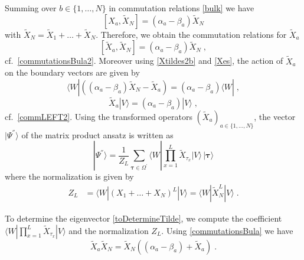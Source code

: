 \documentclass[10pt]{article}
\numberwithin{equation}{section}
\numberwithin{equation}{subsection}
\newcommand{\Xt}{\widetilde{X}}
\newcommand{\co}{\;,}
\newcommand{\dt}{\;.}
\begin{document}
Summing over $b\in \{1,\ldots,N\}$ in commutation relations \eqref{bulk} we have
\begin{equation} 
	\left[X_{a},\Xt_{N}\right]=(\alpha_{a}-\beta_{a})\Xt_{N}%
\end{equation}
with $\widetilde{X}_{N}=\widetilde{X}_{1}+\ldots+\widetilde{X}_{N}$. 
Therefore, we obtain the commutation relations for $\Xt_{a}$ 
\begin{equation}\label{commutationsBula}
	\left[\Xt_{a},\Xt_{N}\right]=(\alpha_{a}-\beta_{a})\Xt_{N}\co %
\end{equation}
cf.~\eqref{commutationsBula2}.
Moreover using \eqref{Xtildes2b} and \eqref{Xes}, the action of $\Xt_{a}$ on the boundary vectors are given by 
\begin{equation}\label{commLEFT}
	\langle W|\left((\alpha_{a}-\beta_{a})\Xt_{N}-\Xt_{a}\right)=(\alpha_{a}-\beta_{a})\langle W|%
	\co
\end{equation}
\begin{equation}\label{commRIGHT}
	\Xt_{a} |V\rangle= (\alpha_{a}-\beta_{a})|V\rangle%
	\co
\end{equation} 
cf.~\eqref{commLEFT2}.
Using the transformed operators $(\widetilde{X}_{a})_{a\in\{1,\ldots,N\}}$, the vector $|\Psi^{''}\rangle$ of the matrix product ansatz is written as
\begin{equation}\label{toDetermineTilde}
	|\Psi^{''}\rangle = \frac{1}{Z_{L}}\sum_{\bm{\tau}\in \Omega^{'}}\langle W|\prod_{x=1}^{L}\widetilde{X}_{\tau_{x}}
	|V \rangle \,|\bm{\tau}\rangle
\end{equation}
where the normalization is given by 
\begin{align}
		Z_{L}&=\langle W|(X_{1}+\ldots+X_{N})^{L}|V\rangle=\langle W|\widetilde{X}_{N}^{L}|V\rangle\dt
\end{align}
\begin{comment}
The basis is 
$$
|\bm{n}\rangle =|n_{1}^{1},\ldots,n_{N}^{1}\rangle \otimes \ldots\otimes |n_{1}^{L},\ldots,n_{N}^{L}\rangle
$$
such that, for each site $x\in \{1,\ldots,L\}$, $|n^{x}\rangle=|n_{1}^{x},\ldots,n_{N}^{x}\rangle\in \Omega_{x}^{'}$. \\
\end{comment}
To determine the eigenvector \eqref{toDetermineTilde}, we compute the coefficient $\langle W|\prod_{x=1}^{L}\widetilde{X}_{\tau_{x}}
|V \rangle$ and the normalization $Z_{L}$. Using \eqref{commutationsBula} we have
\begin{equation}\label{UsefulRelation}
	\widetilde{X}_{a}\widetilde{X}_{N}=\widetilde{X}_{N}\left((\alpha_{a}-\beta_{a})+\widetilde{X}_{a}\right)\dt
\end{equation}
\end{document}
